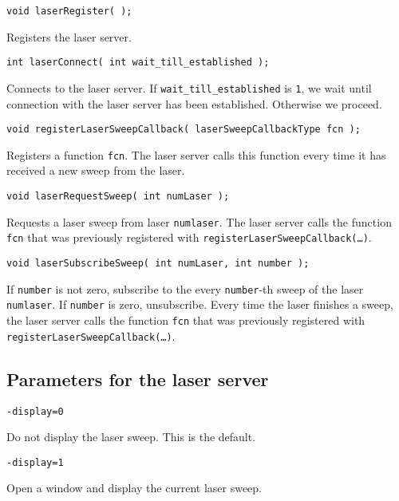 \documentclass{article}
\begin{document}
\begin{description}
  
\item \texttt{void laserRegister( );}

  Registers the laser server.
 
\item \texttt{int laserConnect( int wait\_till\_established );} 
  
  Connects to the laser server. If \texttt{wait\_till\_established} is
  \texttt{1}, we wait until connection with the laser server has been
  established. Otherwise we proceed.
 
\item \texttt{void registerLaserSweepCallback( laserSweepCallbackType fcn );}
  
  Registers a function \texttt{fcn}. The laser server calls this function
  every time it has received a new sweep from the laser.

\item \texttt{void laserRequestSweep( int numLaser );}
  
  Requests a laser sweep from laser \texttt{numlaser}. The laser server calls
  the function \texttt{fcn} that was previously registered with
  \texttt{registerLaserSweepCallback(\dots)}.

\item \texttt{void laserSubscribeSweep( int numLaser, int number );}
  
  If \texttt{number} is not zero, subscribe to the every \texttt{number}-th
  sweep of the laser \texttt{numlaser}. If \texttt{number} is zero,
  unsubscribe. Every time the laser finishes a sweep, the laser server calls
  the function \texttt{fcn} that was previously registered with
  \texttt{registerLaserSweepCallback(\dots)}.

\end{description}

\subsection{Parameters for the laser server}

\begin{description}

\item \texttt{-display=0}
  
  Do not display the laser sweep. This is the default.

\item \texttt{-display=1}
  
  Open a window and display the current laser sweep.

\end{description}
\end{document}
